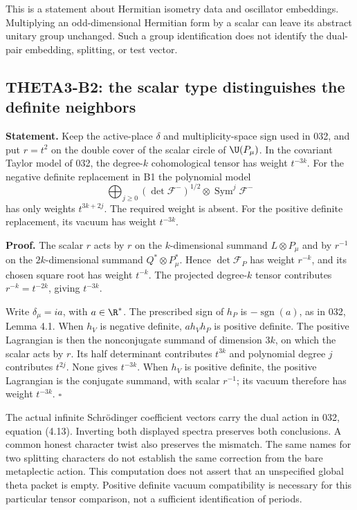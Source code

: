 \documentclass[11pt]{article}
\theoremstyle{definition}\newtheorem{definition}[theorem]{Definition}\newtheorem{remark}[theorem]{Remark}
\begin{document}
This is a statement about Hermitian isometry data and oscillator embeddings. Multiplying an odd-dimensional Hermitian form by a scalar can leave its abstract unitary group unchanged. Such a group identification does not identify the dual-pair embedding, splitting, or test vector.

\subsection{THETA3-B2: the scalar type distinguishes the definite neighbors}\label{B2}

\textbf{Statement.} Keep the active-place $\delta$ and multiplicity-space sign used in 032, and put $r=t^2$ on the double cover of the scalar circle of $\U(P_\mu)$. In the covariant Taylor model of 032, the degree-$k$ cohomological tensor has weight $t^{-3k}$. For the negative definite replacement in B1 the polynomial model
\[
 \bigoplus_{j\geq0}(\det\mathcal F^-)^{1/2}\otimes
                    \operatorname{Sym}^j\mathcal F^-
\]
has only weights $t^{3k+2j}$. The required weight is absent. For the positive definite replacement, its vacuum has weight $t^{-3k}$.

\textbf{Proof.} The scalar $r$ acts by $r$ on the $k$-dimensional summand $L\otimes P_\mu$ and by $r^{-1}$ on the $2k$-dimensional summand $Q^*\otimes P_\mu^*$. Hence $\det\mathcal F_P$ has weight $r^{-k}$, and its chosen square root has weight $t^{-k}$. The projected degree-$k$ tensor contributes $r^{-k}=t^{-2k}$, giving $t^{-3k}$.

Write $\delta_\mu=ia$, with $a\in\R^*$. The prescribed sign of $h_P$ is $-\operatorname{sgn}(a)$, as in 032, Lemma 4.1. When $h_V$ is negative definite, $a h_Vh_P$ is positive definite. The positive Lagrangian is then the nonconjugate summand of dimension $3k$, on which the scalar acts by $r$. Its half determinant contributes $t^{3k}$ and polynomial degree $j$ contributes $t^{2j}$. None gives $t^{-3k}$. When $h_V$ is positive definite, the positive Lagrangian is the conjugate summand, with scalar $r^{-1}$; its vacuum therefore has weight $t^{-3k}$. \hfill$\square$

The actual infinite Schr\"odinger coefficient vectors carry the dual action in 032, equation (4.13). Inverting both displayed spectra preserves both conclusions. A common honest character twist also preserves the mismatch. The same names for two splitting characters do not establish the same correction from the bare metaplectic action. This computation does not assert that an unspecified global theta packet is empty. Positive definite vacuum compatibility is necessary for this particular tensor comparison, not a sufficient identification of periods.
\end{document}
